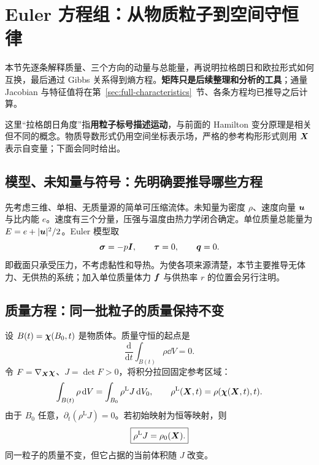 \section{Euler 方程组：从物质粒子到空间守恒律}\label{sec:euler-three-views}

本节先逐条解释质量、三个方向的动量与总能量，再说明拉格朗日和欧拉形式如何互换，最后通过 Gibbs 关系得到熵方程。\textbf{矩阵只是后续整理和分析的工具}；通量 Jacobian 与特征值将在第~\ref{sec:full-characteristics}~节、各条方程均已推导之后计算。

这里“拉格朗日角度”指\textbf{用粒子标号描述运动}，与前面的 Hamilton 变分原理是相关但不同的概念。物质导数形式仍用空间坐标表示场，严格的参考构形形式则用 $\bm{X}$ 表示自变量；下面会同时给出。

\subsection{模型、未知量与符号：先明确要推导哪些方程}

先考虑三维、单相、无质量源的简单可压缩流体。未知量为密度 $\rho$、速度向量 $\bm{u}$ 与比内能 $e$。速度有三个分量，压强与温度由热力学闭合确定。单位质量总能量为 $E=e+|\bm{u}|^2/2$。Euler 模型取
\begin{equation}
 \bm{\sigma}=-p\bm{I},\qquad\bm{\tau}=0,\qquad\bm{q}=0.
\end{equation}
即截面只承受压力，不考虑黏性和导热。为使各项来源清楚，本节主要推导无体力、无供热的系统；加入单位质量体力 $\bm{f}$ 与供热率 $r$ 的位置会另行注明。

\subsection{质量方程：同一批粒子的质量保持不变}

设 $B(t)=\bm{\chi}(B_0,t)$ 是物质体。质量守恒的起点是
\begin{equation}
 \frac{\mathrm d}{\mathrm dt}\int_{B(t)}\rho\dd V=0.
\end{equation}
令 $F=\nabla_{\bm{X}}\bm{\chi}$、$J=\det F>0$，将积分拉回固定参考区域：
\begin{equation}
 \int_{B(t)}\rho\,\mathrm d V=\int_{B_0}\rho^{\mathrm L}J\,\mathrm d V_0,
 \qquad \rho^{\mathrm L}(\bm{X},t)=\rho(\bm{\chi}(\bm{X},t),t).
\end{equation}
由于 $B_0$ 任意，$\partial_t(\rho^{\mathrm L}J)=0$。若初始映射为恒等映射，则
\begin{equation}
 \boxed{\rho^{\mathrm L}J=\rho_0(\bm{X}).}\label{eq:euler-reference-mass}
\end{equation}
同一粒子的质量不变，但它占据的当前体积随 $J$ 改变。

